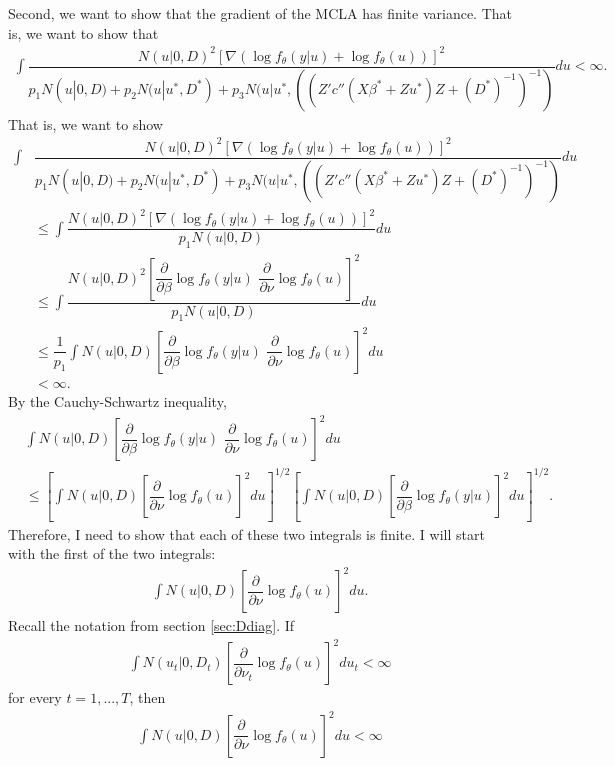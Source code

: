 \documentclass{article}
\begin{document}
Second, we want to show that the gradient of the MCLA has finite variance. That is, we want to show that
\begin{align}
\int \dfrac{N(u|0,D)^2 \left[\nabla \left(\log f_\theta(y|u)+\log f_\theta (u) \right) \right]^2}{p_1 N(u|0,D)+p_2 N(u|u^*, D^*) + p_3 N(u|u^*, ((Z'  c''(X \beta^*+Zu^*) Z +(D^*)^{-1}   )^{-1})} du < \infty.
\end{align}
That is, we want to show 
\begin{align}
\int &\dfrac{N(u|0,D)^2 \left[\nabla \left(\log f_\theta(y|u)+\log f_\theta (u) \right) \right]^2}{p_1 N(u|0,D)+p_2 N(u|u^*, D^*) + p_3 N(u|u^*, ((Z'  c''(X \beta^*+Zu^*) Z +(D^*)^{-1}   )^{-1})} du \\
&\leq \int  \dfrac{N(u|0,D)^2 \left[\nabla \left(\log f_\theta(y|u) + \log f_\theta (u) \right) \right]^2}{p_1 N(u|0,D)} du  \\
&\leq  \int \dfrac{N(u|0,D)^2 \left[ \dfrac{\partial}{\partial \beta} \log f_\theta(y|u) \, \, \dfrac{\partial}{\partial \nu} \log f_\theta (u)  \right]^2}{p_1 N(u|0,D)} du  \\
&\leq \dfrac{1}{p_1}  \int N(u|0,D) \left[ \dfrac{\partial}{\partial \beta}\log f_\theta(y|u) \, \, \dfrac{\partial}{\partial \nu} \log f_\theta (u)  \right]^2 du  \\
&< \infty.
\end{align}
By the Cauchy-Schwartz inequality, 
\begin{align}
  &\int N(u|0,D) \left[ \dfrac{\partial}{\partial \beta}\log f_\theta(y|u) \, \, \dfrac{\partial}{\partial \nu} \log f_\theta (u)  \right]^2 du \\
& \leq \left[  \int N(u|0,D) \left[  \dfrac{\partial}{\partial \nu} \log f_\theta (u)  \right]^2 du \right]^{1/2}  \left[  \int N(u|0,D) \left[ \dfrac{\partial}{\partial \beta}\log f_\theta(y|u)   \right]^2 du \right]^{1/2} .
\end{align}
Therefore, I need to show that each of these two integrals is finite.  I will start with the first of the two integrals: 
\begin{align}
\int N(u|0,D) \left[  \dfrac{\partial}{\partial \nu} \log f_\theta(u)  \right]^2 du. 
\end{align}
Recall the notation from section \ref{sec:Ddiag}.  If
\begin{align}
\int N(u_t|0,D_t) \left[  \dfrac{\partial}{\partial \nu_t} \log f_\theta(u)  \right]^2 du_t< \infty 
\end{align}
for every $t=1,...,T$, then
\begin{align}
\int N(u|0,D) \left[  \dfrac{\partial}{\partial \nu} \log f_\theta(u)  \right]^2 du < \infty
\end{align}
\end{document}
